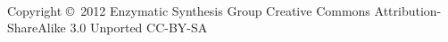 \thispagestyle{empty}

~\vfill

Copyright \copyright\ 2012 Enzymatic Synthesis Group
\newline
\newline
Creative Commons Attribution-ShareAlike 3.0 Unported
\newline
\newline
CC-BY-SA
\pagebreak
